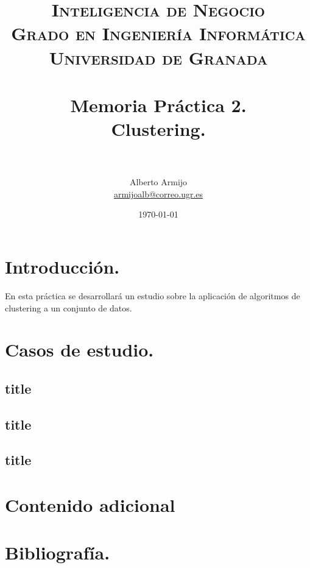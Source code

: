

\title{	
	\normalfont \normalsize 
	\textsc{\textbf{Inteligencia de Negocio} \\ Grado en Ingeniería Informática \\ Universidad de Granada} \\ [25pt] %
	\horrule{0.5pt} \\[0.4cm] %
	\huge Memoria Práctica 2. \\
	\huge Clustering.
	\\ %
	\horrule{2pt} \\[0.5cm] %
}

\author{Alberto Armijo  \\
\href{mailto:armijoalb@correo.ugr.es}{armijoalb@correo.ugr.es}} %
\date{\normalsize\today} %



	
	\maketitle %
	
	\newpage %
	
	\tableofcontents %
	
	\listoffigures
	
	\newpage
	
	\section[Introducción]{Introducción.}
	En esta práctica se desarrollará un estudio sobre la aplicación de algoritmos de clustering a un conjunto de datos.
	\section[Casos de estudio]{Casos de estudio.}
	\subsection[Caso de estudio 1]{title}
	\subsection[Caso de estudio 2]{title}
	\subsection[Caso de estudio 3]{title}
	\section[Contenido adicional]{Contenido adicional}
	\section[Bibliografía]{Bibliografía.}

